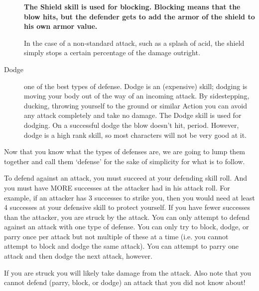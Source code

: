 \documentclass[twoside]{book}
\begin{document}
\begin{description}
{ \textbf{ The Shield skill is used for blocking. Blocking
                    means that the blow hits, but the defender gets to
                    add the armor of the shield to his own armor value.
                    }

  In the case of a non-standard attack, such
                    as a splash of acid, the shield simply stops a
                    certain percentage of the damage outright.
                
    }
  
  \item[ Dodge ] 
    {  
     one of the best types of defense. Dodge is an
                   (expensive) skill; dodging is moving your body out of
                   the way of an incoming attack. By sidestepping,
                   ducking, throwing yourself to the ground or similar
                   Action you can avoid any attack completely and take no
                   damage. The Dodge skill is used for dodging. On a
                   successful dodge the blow doesn't hit, period.
                   However, dodge is a high rank skill, so most
                   characters will not be very good at it. 
    }
  
\end{description}
  
    {  
     Now that you know what the types of defenses are, we
               are going to lump them together and call them
               `defense' for the sake of simplicity for what
               is to follow. 
    }
  
    {  
     To defend against an attack, you must succeed at
               your defending skill roll. And you must have MORE
               successes at the attacker had in his attack roll. For
               example, if an attacker has 3 successes to strike you,
               then you would need at least 4 successes at your defensive
               skill to protect yourself. If you have fewer successes
               than the attacker, you are struck by the attack. You can
               only attempt to defend against an attack with one type of
               defense. You can only try to block, dodge, or parry once
               per attack but not multiple of these at a time (i.e. you
               cannot attempt to block and dodge the same attack). You
               can attempt to parry one attack and then dodge the next
               attack, however. 
    }
  
    {  
     If you are struck you will likely take damage from
               the attack. Also note that you cannot defend (parry,
               block, or dodge) an attack that you did not know about!
               
    }
  
\end{document}

